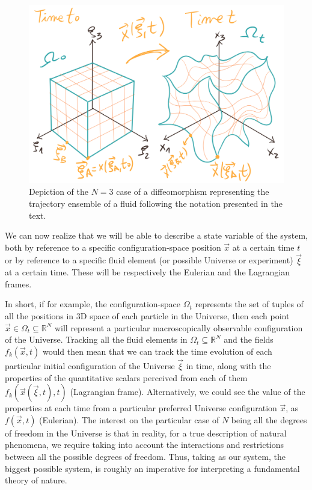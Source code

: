 \documentclass[11pt, a4paper]{article} %
\newcommand{\R}{\mathbb{R}} %
\begin{document}
\begin{figure}[h!]
  \centering
    \includegraphics[width=0.57\linewidth]{1deforma.png}
  \caption{Depiction of the $N=3$ case of a diffeomorphism representing the trajectory ensemble of a fluid following the notation presented in the text. \vspace{-0.2cm}}
  \label{fig:deform}
\end{figure}

We can now realize that we will be able to describe a state variable of the system, both by reference to a specific configuration-space position $\vec{x}$ at a certain time $t$ or by reference to a specific fluid element (or possible Universe or experiment) $\vec{\xi}$ at a certain time. These will be respectively the Eulerian and the Lagrangian frames. 

In short, if for example, the configuration-space $\Omega_t$ represents the set of tuples of all the positions in 3D space of each particle in the Universe, then each point $\vec{x}\in\Omega_t\subseteq \R^N$ will represent a particular macroscopically observable configuration of the Universe. Tracking all the fluid elements in $\Omega_t\subseteq\R^N$ and the fields $f_k(\vec{x},t)$ would then mean that we can track the time evolution of each particular initial configuration of the Universe $\vec{\xi}$ in time, along with the properties of the quantitative scalars perceived from each of them $f_k(\vec{x}(\vec{\xi},t),t)$ (Lagrangian frame). Alternatively, we could see the value of the properties at each time from a particular preferred Universe configuration $\vec{x}$, as $f(\vec{x},t)$ (Eulerian). The interest on the particular case of $N$ being all the degrees of freedom in the Universe is that in reality, for a true description of natural phenomena, we require taking into account the interactions and restrictions between all the possible degrees of freedom. Thus, taking as our system, the biggest possible system, is roughly an imperative for interpreting a fundamental theory of nature.
\end{document}
